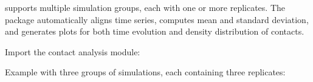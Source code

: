 \documentclass[a4paper,10pt,english]{sphinxmanual}
\begin{document}
\sphinxAtStartPar
{} supports multiple simulation groups, each with one or more replicates. The package automatically aligns time series, computes mean and standard deviation, and generates plots for both time evolution and density distribution of contacts.

\sphinxAtStartPar
{}

\sphinxAtStartPar
Import the contact analysis module:

\begin{sphinxVerbatim}[commandchars=\\\{\}]
 
\end{sphinxVerbatim}

\sphinxAtStartPar
Example with three groups of simulations, each containing three replicates:
\end{document}
